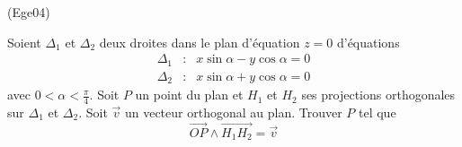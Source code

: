\begin{tiny}(Ege04)\end{tiny}
Soient $\Delta _{1}$ et $\Delta _{2}$ deux droites dans le plan d'équation $z=0$ d'{\'e}quations
\begin{align*}
\Delta _{1} &:& x\sin \alpha -y\cos \alpha =0 \\
\Delta _{2} &:& x\sin \alpha +y\cos \alpha =0
\end{align*}
avec $0<\alpha <\frac{\pi }{4}$. Soit $P$ un point du plan et $H_{1}$ et $H_{2}$ ses projections orthogonales sur $\Delta _{1}$ et $\Delta_{2}$. Soit
$\overrightarrow{v}$ un vecteur orthogonal au plan. Trouver $P$ tel que 
\begin{displaymath}
 \overrightarrow{OP}\wedge
\overrightarrow{H_{1}H_{2}}=\overrightarrow{v}
\end{displaymath}
